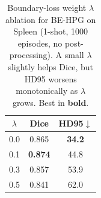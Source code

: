 \begin{table}[t]
\centering
\caption{Boundary-loss weight $\lambda$ ablation for BE-HPG on Spleen (1-shot, 1000 episodes, no post-processing). A small $\lambda$ slightly helps Dice, but HD95 worsens monotonically as $\lambda$ grows. Best in \textbf{bold}.}
\label{tab:ablation}
\begin{tabular}{ccc}
\toprule
$\lambda$ & Dice & HD95$\downarrow$ \\
\midrule
0.0 & 0.865 & \textbf{34.2} \\
0.1 & \textbf{0.874} & 44.8 \\
0.3 & 0.857 & 53.9 \\
0.5 & 0.841 & 62.0 \\
\bottomrule
\end{tabular}
\end{table}
